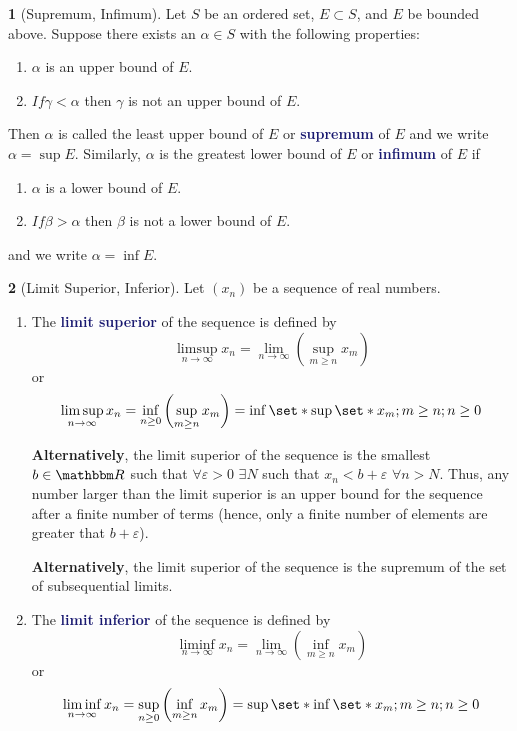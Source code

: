 \documentclass[12pt]{article}
\numberwithin{equation}{section}
\newcommand{\navy}[1]{\textcolor{MidnightBlue}{\bf #1}}
\theoremstyle{plain}
\theoremstyle{definition}
\newtheorem{definition}{\color{MidnightBlue}{\textbf{Definition}}}[section]
\newcommand\parens[1]{\left( #1 \right)}
\def\Set{\set*}%
\newcommand{\1}{\mathbbm 1}
\newcommand{\e}{\varepsilon}
\newcommand{\RR}{\mathbbm R}
\begin{document}
\begin{definition}[Supremum, Infimum]
Let $S$ be an ordered set, $E \subset S$, and $E$ be bounded above. Suppose there exists an $\alpha \in S$ with the following properties:
\begin{enumerate}
\item $\alpha$ is an upper bound of $E$.
\item $If \gamma < \alpha$ then $\gamma$ is not an upper bound of $E$.
\end{enumerate}
Then $\alpha$ is called the least upper bound of $E$ or \navy{supremum} of $E$ and we write $\alpha = \sup E$. Similarly, $\alpha$ is the greatest lower bound of $E$ or \navy{infimum} of $E$ if
\begin{enumerate}
\item $\alpha$ is a lower bound of $E$.
\item $If \beta > \alpha$ then $\beta$ is not a lower bound of $E$.
\end{enumerate}
and we write $\alpha = \inf E$.
\end{definition}

\begin{definition}[Limit Superior, Inferior]
Let $\parens{x_n}$ be a sequence of real numbers.

\begin{enumerate}
\item The \navy{limit superior} of the sequence is defined by
\begin{equation}
\limsup\limits_{n \to \infty} x_n = \lim_{n \to \infty}\parens{\sup_{m \geq n} x_m}
\end{equation}
or
\begin{equation}
\limsup\limits_{n \to \infty} x_n = \inf_{n \geq 0} \parens{\sup_{m \geq n} x_m} = \inf\Set{\sup \Set{x_m; m \geq n}; n \geq 0}
\end{equation}

\textbf{Alternatively}, the limit superior of the sequence is the smallest $b \in \RR$ such that $\forall \e > 0$ $\exists N$ such that $x_n < b + \e$ $\forall n > N$. Thus, any number larger than the limit superior is an upper bound for the sequence after a finite number of terms (hence, only a finite number of elements are greater that $b + \e$).

\textbf{Alternatively}, the limit superior of the sequence is the supremum of the set of subsequential limits.

\item The \navy{limit inferior} of the sequence is defined by
\begin{equation}
\liminf\limits_{n \to \infty} x_n = \lim_{n \to \infty}\parens{\inf_{m \geq n} x_m}
\end{equation}
or
\begin{equation}
\liminf\limits_{n \to \infty} x_n = \sup_{n \geq 0} \parens{\inf_{m \geq n} x_m} = \sup\Set{\inf \Set{x_m; m \geq n}; n \geq 0}
\end{equation}
\end{enumerate}

\end{definition}
\end{document}
